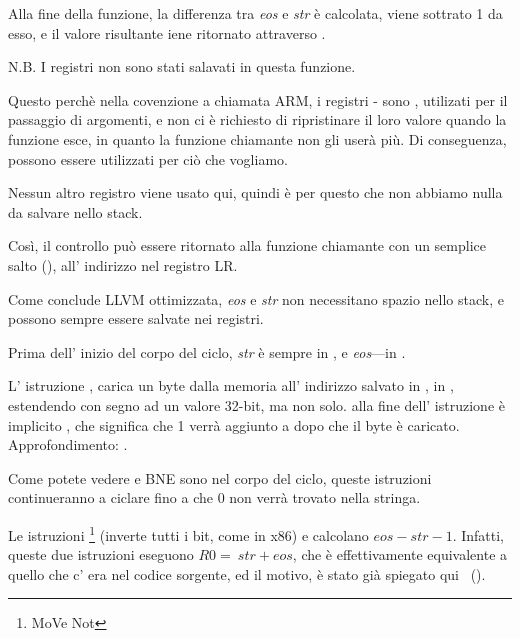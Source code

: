 Alla fine della funzione, la differenza tra 
\emph{eos} e \emph{str} è calcolata, viene sottrato 1 da esso, e il valore risultante iene ritornato
attraverso .

N.B. I registri non sono stati salavati in questa funzione.

Questo perchè nella covenzione a chiamata ARM, i registri - sono , 
utilizati per il passaggio di argomenti,
e non ci è richiesto di ripristinare il loro valore quando la funzione esce, 
in quanto la funzione chiamante non gli userà più.
Di conseguenza, possono essere utilizzati per ciò che vogliamo.

Nessun altro registro viene usato qui, quindi è per questo che non abbiamo nulla da salvare nello stack.

Così, il controllo può essere ritornato alla funzione chiamante con un semplice salto (),
all' indirizzo nel registro \ac{LR}.

\mysubparagraph{\OptimizingXcodeIV (\ThumbMode)}



Come conclude LLVM ottimizzata, \emph{eos} e \emph{str} non necessitano spazio nello stack, e possono sempre essere salvate nei registri.

Prima dell' inizio del corpo del ciclo, \emph{str} è sempre in , 
e \emph{eos}---in .

L' istruzione , carica un byte dalla memoria all' indirizzo salvato in , in , estendendo con segno ad un valore 32-bit, ma non solo.
 alla fine dell' istruzione è implicito , che significa che 1 verrà aggiunto a  dopo che il byte è caricato.
Approfondimento: .

Come potete vedere \CMP e \ac{BNE} sono nel corpo del ciclo, queste istruzioni continueranno a ciclare fino a che 0 non verrà trovato nella stringa.

Le istruzioni \footnote{MoVe Not} (inverte tutti i bit, come \NOT in x86) e \ADD calcolano $eos - str - 1$.
Infatti, queste due istruzioni eseguono $R0 = ~str + eos$, 
che è effettivamente equivalente a quello che c' era nel codice sorgente, ed il motivo, è stato già spiegato qui
~().


